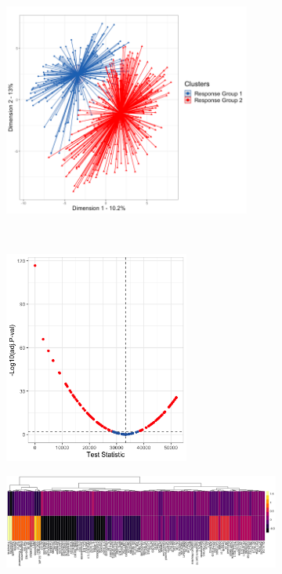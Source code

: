 \documentclass[10pt, letterpaper]{article}
\begin{document}
\begin{multicols}{2}
\begin{figure}[!ht]
    \centering
    \begin{subfigure}[t]{0.5\textwidth}
        \centering
        \includegraphics[height=2.75in]{Figures/pca.png}
        \caption{}
        \label{fig:pca}
    \end{subfigure}%
    ~
    \begin{subfigure}[t]{0.5\textwidth}
        \centering
        \includegraphics[height=2.75in]{Figures/volcano.png}
        \caption{}
        \label{fig:volcano}
    \end{subfigure}

    \begin{subfigure}[t]{\textwidth}
        \centering
        \includegraphics[width=\textwidth]{Figures/heatmap.png}
        \caption{}
        \label{fig:heatmap}
    \end{subfigure}


\end{figure}
\end{multicols}
\end{document}
